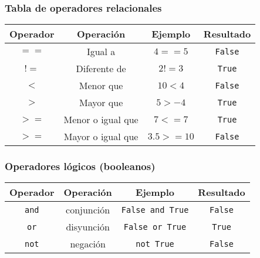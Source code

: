 \documentclass[12pt]{beamer}
\begin{document}
\begin{frame}
\frametitle{Tabla de operadores relacionales}
\begin{center}
\begin{tabular}{| c | c | c | c |}
\hline
Operador & Operaci\'{o}n & Ejemplo & Resultado \\
\hline
\hline
$==$ & Igual a & $4==5$ & \texttt{False}  \\
$!=$ & Diferente de & $2!=3$ & \texttt{True} \\
$<$ & Menor que & $10<4$ & \texttt{False} \\
$>$ & Mayor que & $5>-4$ & \texttt{True} \\
$>=$ & Menor o igual que & $7<=7$ & \texttt{True} \\
$>=$ & Mayor o igual que & $3.5 >= 10$ & \texttt{False} \\
\hline
\end{tabular}
\end{center}
\end{frame}
\begin{frame}
\frametitle{Operadores l\'{o}gicos (booleanos)}
\begin{center}
\begin{tabular}{| c | c | c | c |}
\hline
Operador & Operaci\'{o}n & Ejemplo & Resultado \\
\hline
\hline
\texttt{and} & conjunci\'{o}n & \texttt{False and True} & \texttt{False} \\
\texttt{or} & disyunci\'{o}n & \texttt{False or True} & \texttt{True} \\
\texttt{not} & negaci\'{o}n & \texttt{not True} & \texttt{False} \\
\hline
\end{tabular}
\end{center}
\end{frame}
\end{document}
